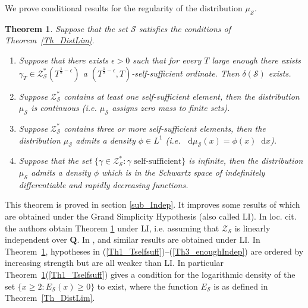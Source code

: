 \documentclass[a4paper,10pt]{amsart}
\theoremstyle{plain}
\newtheorem{theo}{Theorem}[section]
\theoremstyle{definition}
\begin{document}
We prove conditional results for the regularity of the distribution $\mu_{\mathcal{S}}$.

\begin{theo}\label{Th_withLI}
Suppose that the set $\mathcal{S}$ satisfies the conditions of Theorem~\ref{Th_DistLim}.
\begin{enumerate}
\item\label{Th1_Tselfsuff} Suppose that there exists $\epsilon>0$ such that for every $T$ large enough there exists $\gamma_{T}\in \mathcal{Z}_{\mathcal{S}}^{*}(T^{\frac{1}{2} - \epsilon})$ a $(T^{\frac{1}{2} - \epsilon},T)$-self-sufficient ordinate.
Then $\delta(\mathcal{S})$ exists.
\item\label{Th1_LI1} Suppose $\mathcal{Z}^{*}_{\mathcal{S}}$ contains at least one self-sufficient element, 
then the distribution $\mu_{\mathcal{S}}$ is continuous (\textit{i.e.} $\mu_{\mathcal{S}}$ assigns zero mass to finite sets).
\item\label{Th2_LI3} Suppose $\mathcal{Z}^{*}_{\mathcal{S}}$ contains three or more self-sufficient elements, 
then the distribution $\mu_{\mathcal{S}}$ admits a density $\phi\in L^{1}$ (\textit{i.e.} ${\mathop{}\!\mathrm{d}}\mu_{\mathcal{S}}(x) = \phi(x){\mathop{}\!\mathrm{d}} x$).
\item\label{Th3_enoughIndep} Suppose that the set 
$\lbrace\gamma\in\mathcal{Z}_{\mathcal{S}}^{*} : \gamma \text{ self-sufficient} \rbrace$ is infinite, 
then the distribution $\mu_{\mathcal{S}}$ admits a density $\phi$ which is in the Schwartz space of indefinitely differentiable and rapidly decreasing functions.
\end{enumerate}
\end{theo}

This theorem is proved in section \ref{sub_Indep}.
It improves some results of \cite{RS} which are obtained under the Grand Simplicity Hypothesis (also called LI).
In loc. cit. the authors obtain Theorem \ref{Th_withLI} under LI, 
i.e. assuming that $\mathcal{Z}_{\mathcal{S}}$ is linearly independent over $\mathbf{Q}$.
In \cite{NgThesis}, \cite{ANS} and \cite{FioEC} similar results are obtained under LI.
In Theorem~\ref{Th_withLI}, hypotheses in (\ref{Th1_Tselfsuff})--(\ref{Th3_enoughIndep}) are ordered by increasing strength 
but are all weaker than LI.
In particular Theorem~\ref{Th_withLI}(\ref{Th1_Tselfsuff}) gives a condition for the logarithmic density of the set 
$\lbrace x\geq 2: E_{\mathcal{S}}(x)\geq 0\rbrace$ to exist, 
where the function $E_{\mathcal{S}}$ is as defined in Theorem~\ref{Th_DistLim}.
\end{document}
